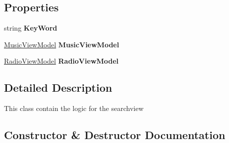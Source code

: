 \subsection*{Properties}
\begin{DoxyCompactItemize}
\item 
\mbox{\label{class_presentation_1_1_view_model_1_1_search_view_model_a8ded5aefcb69f87edbd81318b4018a44}} 
string {\bfseries Key\+Word}
\item 
\mbox{\label{class_presentation_1_1_view_model_1_1_search_view_model_affc0751a1fcce107235fbf29e5c91f61}} 
\hyperlink{class_presentation_1_1_view_model_1_1_music_view_model}{Music\+View\+Model} {\bfseries Music\+View\+Model}
\item 
\mbox{\label{class_presentation_1_1_view_model_1_1_search_view_model_a88c0d8f4fc9d869857814bbad0edd3d2}} 
\hyperlink{class_presentation_1_1_view_model_1_1_radio_view_model}{Radio\+View\+Model} {\bfseries Radio\+View\+Model}
\end{DoxyCompactItemize}


\subsection{Detailed Description}
This class contain the logic for the searchview 



\subsection{Constructor \& Destructor Documentation}
\mbox{\label{class_presentation_1_1_view_model_1_1_search_view_model_a325a16f61ed7bc7dedd583b5f5f5faec}} 
